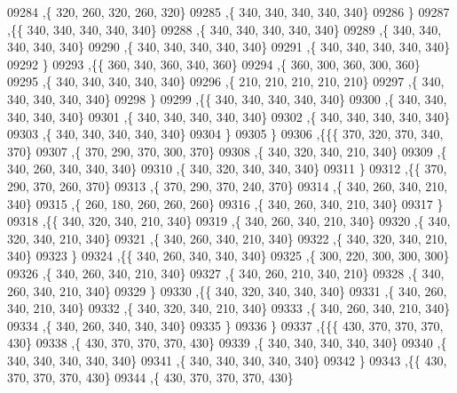 \begin{DoxyCode}
09284     ,\{   320,   260,   320,   260,   320\}
09285     ,\{   340,   340,   340,   340,   340\}
09286     \}
09287    ,\{\{   340,   340,   340,   340,   340\}
09288     ,\{   340,   340,   340,   340,   340\}
09289     ,\{   340,   340,   340,   340,   340\}
09290     ,\{   340,   340,   340,   340,   340\}
09291     ,\{   340,   340,   340,   340,   340\}
09292     \}
09293    ,\{\{   360,   340,   360,   340,   360\}
09294     ,\{   360,   300,   360,   300,   360\}
09295     ,\{   340,   340,   340,   340,   340\}
09296     ,\{   210,   210,   210,   210,   210\}
09297     ,\{   340,   340,   340,   340,   340\}
09298     \}
09299    ,\{\{   340,   340,   340,   340,   340\}
09300     ,\{   340,   340,   340,   340,   340\}
09301     ,\{   340,   340,   340,   340,   340\}
09302     ,\{   340,   340,   340,   340,   340\}
09303     ,\{   340,   340,   340,   340,   340\}
09304     \}
09305    \}
09306   ,\{\{\{   370,   320,   370,   340,   370\}
09307     ,\{   370,   290,   370,   300,   370\}
09308     ,\{   340,   320,   340,   210,   340\}
09309     ,\{   340,   260,   340,   340,   340\}
09310     ,\{   340,   320,   340,   340,   340\}
09311     \}
09312    ,\{\{   370,   290,   370,   260,   370\}
09313     ,\{   370,   290,   370,   240,   370\}
09314     ,\{   340,   260,   340,   210,   340\}
09315     ,\{   260,   180,   260,   260,   260\}
09316     ,\{   340,   260,   340,   210,   340\}
09317     \}
09318    ,\{\{   340,   320,   340,   210,   340\}
09319     ,\{   340,   260,   340,   210,   340\}
09320     ,\{   340,   320,   340,   210,   340\}
09321     ,\{   340,   260,   340,   210,   340\}
09322     ,\{   340,   320,   340,   210,   340\}
09323     \}
09324    ,\{\{   340,   260,   340,   340,   340\}
09325     ,\{   300,   220,   300,   300,   300\}
09326     ,\{   340,   260,   340,   210,   340\}
09327     ,\{   340,   260,   210,   340,   210\}
09328     ,\{   340,   260,   340,   210,   340\}
09329     \}
09330    ,\{\{   340,   320,   340,   340,   340\}
09331     ,\{   340,   260,   340,   210,   340\}
09332     ,\{   340,   320,   340,   210,   340\}
09333     ,\{   340,   260,   340,   210,   340\}
09334     ,\{   340,   260,   340,   340,   340\}
09335     \}
09336    \}
09337   ,\{\{\{   430,   370,   370,   370,   430\}
09338     ,\{   430,   370,   370,   370,   430\}
09339     ,\{   340,   340,   340,   340,   340\}
09340     ,\{   340,   340,   340,   340,   340\}
09341     ,\{   340,   340,   340,   340,   340\}
09342     \}
09343    ,\{\{   430,   370,   370,   370,   430\}
09344     ,\{   430,   370,   370,   370,   430\}

\end{DoxyCode}
